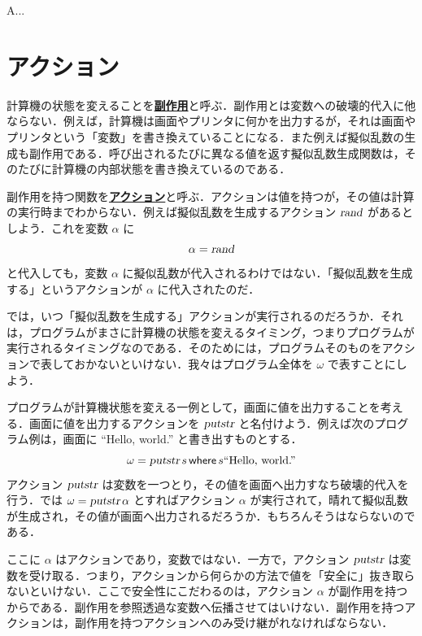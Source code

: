 \documentclass[a4paper,twocolumn]{jsbook}
\newcommand{\keyword}[1]{{\underline{\textbf{#1}}}}
\newcommand{\mKeyword}[1]{\mathsf{#1}} %
\newcommand{\mWhereKeyword}{\mKeyword{where}}
\DeclareMathOperator{\mWhere}{\mWhereKeyword}
\newcommand{\mString}[1]{\text{#1}}
\newcommand{\mAction}[1]{\textsl{#1}}
\DeclareMathOperator{\mPutStr}{\mAction{putstr}}
\DeclareMathOperator{\mRand}{\mAction{rand}}
\DeclareMathOperator{\mLetEq}{\triangleq}
\newcommand{\mWhere}[2]{\mathbin{\mWhereKeyword}#1\mLetEq#2}
\begin{document}
A...

\section{アクション}

計算機の状態を変えることを\keyword{副作用}と呼ぶ．副作用とは変数への破壊的代入に他ならない．例えば，計算機は画面やプリンタに何かを出力するが，それは画面やプリンタという「変数」を書き換えていることになる．また例えば擬似乱数の生成も副作用である．呼び出されるたびに異なる値を返す擬似乱数生成関数は，そのたびに計算機の内部状態を書き換えているのである．

副作用を持つ関数を\keyword{アクション}と呼ぶ．アクションは値を持つが，その値は計算の実行時までわからない．例えば擬似乱数を生成するアクション $\mRand$ があるとしよう．これを変数 $\alpha$ に
\begin{equation}
\alpha=\mRand
\end{equation}
と代入しても，変数 $\alpha$ に擬似乱数が代入されるわけではない．「擬似乱数を生成する」というアクションが $\alpha$ に代入されたのだ．

では，いつ「擬似乱数を生成する」アクションが実行されるのだろうか．それは，プログラムがまさに計算機の状態を変えるタイミング，つまりプログラムが実行されるタイミングなのである．そのためには，プログラムそのものをアクションで表しておかないといけない．我々はプログラム全体を $\omega$ で表すことにしよう．

プログラムが計算機状態を変える一例として，画面に値を出力することを考える．画面に値を出力するアクションを $\mPutStr$ と名付けよう．例えば次のプログラム例は，画面に ``Hello, world.'' と書き出すものとする．
\begin{equation}
\omega=\mPutStr s\mWhere{s}{\mString{``Hello, world.''}}
\end{equation}
アクション $\mPutStr$ は変数を一つとり，その値を画面へ出力すなち破壊的代入を行う．では $\omega=\mPutStr\alpha$ とすればアクション $\alpha$ が実行されて，晴れて擬似乱数が生成され，その値が画面へ出力されるだろうか．もちろんそうはならないのである．

ここに $\alpha$ はアクションであり，変数ではない．一方で，アクション $\mPutStr$ は変数を受け取る．つまり，アクションから何らかの方法で値を「安全に」抜き取らないといけない．ここで安全性にこだわるのは，アクション $\alpha$ が副作用を持つからである．副作用を参照透過な変数へ伝播させてはいけない．副作用を持つアクションは，副作用を持つアクションへのみ受け継がれなければならない．
\end{document}

